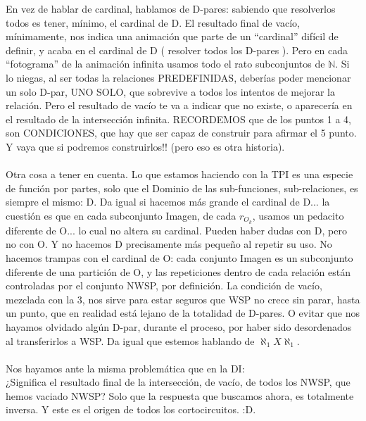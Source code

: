 	\noindent
	En vez de hablar de cardinal, hablamos de D-pares: sabiendo que resolverlos todos es tener, mínimo, el cardinal de D. El resultado final de vacío, mínimamente, nos indica una animación que parte de un ``cardinal'' difícil de definir, y acaba en el cardinal de D ( resolver todos los D-pares ). Pero en cada ``fotograma'' de la animación infinita usamos todo el rato subconjuntos de $\mathbb{N}$. Si lo niegas, al ser todas la relaciones PREDEFINIDAS, deberías poder mencionar un solo D-par, UNO SOLO, que sobrevive a todos los intentos de mejorar la relación. Pero el resultado de vacío te va a indicar que no existe, o aparecería en el resultado de la intersección infinita. RECORDEMOS que de los puntos 1 a 4, son CONDICIONES, que hay que ser capaz de construir para afirmar el 5 punto. Y vaya que si podremos construirlos!! (pero eso es otra historia).
	\\\\
	
	\noindent
	Otra cosa a tener en cuenta. Lo que estamos haciendo con la TPI es una especie de función por partes, solo que el Dominio de las sub-funciones, sub-relaciones, es siempre el mismo: D. Da igual si hacemos más grande el cardinal de D... la cuestión es que en cada subconjunto Imagen, de cada $r_{O_{k}}$, usamos un pedacito diferente de O... lo cual no altera su cardinal. Pueden haber dudas con D, pero no con O. Y no hacemos D precisamente más pequeño al repetir su uso. No hacemos trampas con el cardinal de O: cada conjunto Imagen es un subconjunto diferente de una partición de O, y las repeticiones dentro de cada relación están controladas por el conjunto NWSP, por definición. La condición de vacío, mezclada con la 3, nos sirve para estar seguros que WSP no crece sin parar, hasta un punto, que en realidad está lejano de la totalidad de D-pares. O evitar que nos hayamos olvidado algún D-par, durante el proceso, por haber sido desordenados al transferirlos a WSP. Da igual que estemos hablando de $\aleph_{1} X \aleph_{1}$.
	\\\\
	 
	\noindent
	Nos hayamos ante la misma problemática que en la DI:\\
	¿Significa el resultado final de la intersección, de vacío, de todos los NWSP, que hemos vaciado NWSP? Solo que la respuesta que buscamos ahora, es totalmente inversa. Y este es el origen de todos los cortocircuitos. :D.
	\\\\
	
